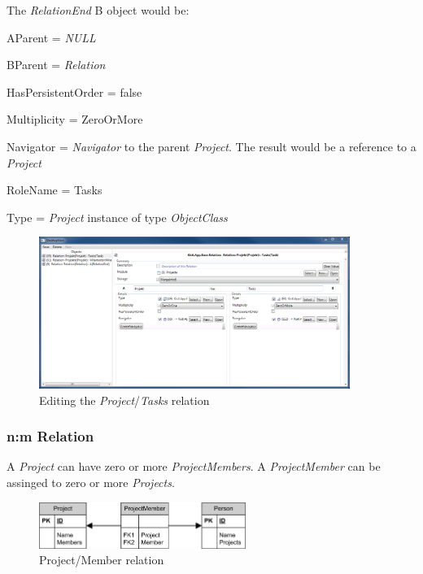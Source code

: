 The \emph{RelationEnd} B object would be:
\begin{descriptionBorder}
	\item[AParent] { =  \emph{NULL} }
	\item[BParent] { = \emph{Relation} }
	\item[HasPersistentOrder] { = false  }
	\item[Multiplicity] { = ZeroOrMore }
	\item[Navigator] { = \emph{Navigator} to the parent \emph{Project}. The result would be a reference to a \emph{Project}  }
	\item[RoleName] { = Tasks }
	\item[Type] { = \emph{Project} instance of type \emph{ObjectClass} }
\end{descriptionBorder}

\begin{figure}[ht]
	\begin{center}
		\includegraphics[width=0.9\textwidth]{images/ScreenShot_Rel_Project_Task.png}
		\caption{Editing the \emph{Project}/\emph{Tasks} relation}
		\label{editing_project_tasks_relation}
	\end{center}
\end{figure}

\subsubsection{n:m Relation}
A \emph{Project} can have zero or more \emph{ProjectMembers}. A \emph{ProjectMember} can be assinged to zero or more \emph{Projects}.

\begin{figure}[ht]
	\begin{center}
		\includegraphics[width=0.6\textwidth]{images/Rel_n_m_Project_Member.png}
		\caption{Project/Member relation}
		\label{project_member_relation}
	\end{center}
\end{figure}

